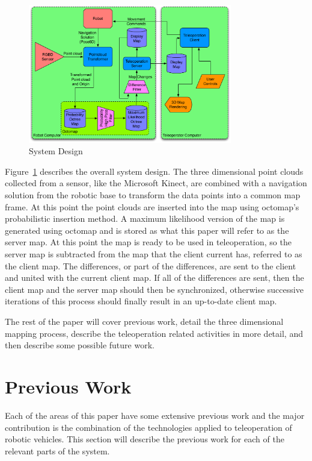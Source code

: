 \documentclass[journal]{IEEEtran}
\begin{document}
  \begin{figure}[here]
    \centering
    \includegraphics[width=3.5in,keepaspectratio]{system_diagram.pdf}
    \caption{System Design}
    \label{fig:system_diagram}
  \end{figure}
  
  Figure~\ref{fig:system_diagram} describes the overall system design.  The 
  three dimensional point clouds collected from a sensor, like the Microsoft 
  Kinect, are combined with a navigation solution from the robotic base to 
  transform the data points into a common map frame.  At this point the point 
  clouds are inserted into the map using octomap's probabilistic insertion 
  method.  A maximum likelihood version of the map is generated using octomap 
  and is stored as what this paper will refer to as the server map.  At this 
  point the map is ready to be used in teleoperation, so the server map is 
  subtracted from the map that the client current has, referred to as the 
  client map.  The differences, or part of the differences, are sent to the 
  client and united with the current client map.  If all of the differences 
  are sent, then the client map and the server map should then be 
  synchronized, otherwise successive iterations of this process should finally 
  result in an up-to-date client map.
  
  The rest of the paper will cover previous work, detail the three dimensional 
  mapping process, describe the teleoperation related activities in more 
  detail, and then describe some possible future work.
  
  \section{Previous Work}
  Each of the areas of this paper have some extensive previous work and the 
  major contribution is the combination of the technologies applied to 
  teleoperation of robotic vehicles.  This section will describe the previous 
  work for each of the relevant parts of the system.
  
\end{document}
